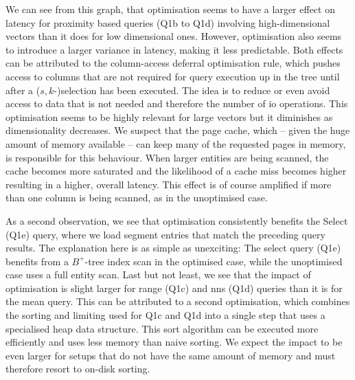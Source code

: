We can see from this graph, that optimisation seems to have a larger effect on latency for proximity based queries (Q1b to Q1d) involving high-dimensional vectors than it does for low dimensional ones. However, optimisation also seems to introduce a larger variance in latency, making it less predictable. Both effects can be attributed to the column-access deferral optimisation rule, which pushes access to columns that are not required for query execution up in the tree until after a ($s,k$-)selection has been executed. The idea is to reduce or even avoid access to data that is not needed and therefore the number of \acrshort{io} operations. This optimisation seems to be highly relevant for large vectors but it diminishes as dimensionality decreases. We suspect that the page cache, which -- given the huge amount of memory available -- can keep many of the requested pages in memory, is responsible for this behaviour. When larger entities are being scanned, the cache becomes more saturated and the likelihood of a cache miss becomes higher resulting in a higher, overall latency. This effect is of course amplified if more than one column is being scanned, as in the unoptimised case.

As a second observation, we see that optimisation consistently benefits the Select (Q1e) query, where we load segment entries that match the preceding query results. The explanation here is as simple as unexciting: The select query (Q1e) benefits from a $B^{+}$-tree index scan in the optimised case, while the unoptimised case uses a full entity scan. Last but not least, we see that the impact of optimisation is slight larger for range (Q1c) and \acrshort{nns} (Q1d) queries than it is for the mean query. This can be attributed to a second optimisation, which combines the sorting and limiting used for Q1c and Q1d into a single step that uses a specialised heap data structure. This sort algorithm can be executed more efficiently and uses less memory than naive sorting. We expect the impact to be even larger for setups that do not have the same amount of memory and must therefore resort to on-disk sorting.

\newpage

